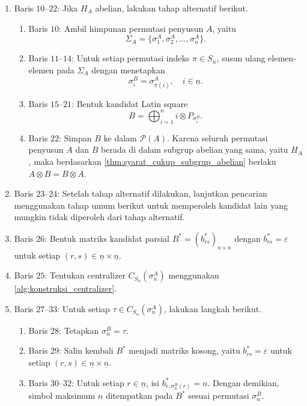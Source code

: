 \begin{algoritma}
\begin{enumerate}
    \item Baris $10$--$22$: Jika $H_A$ abelian, lakukan tahap alternatif berikut.
          \begin{enumerate}
            \item Baris $10$: Ambil himpunan permutasi penyusun $A$, yaitu
                  \[
                    \Sigma_A=\{\sigma_1^A,\sigma_2^A,\ldots,\sigma_n^A\}.
                  \]

            \item Baris $11$--$14$: Untuk setiap permutasi indeks $\pi\in S_n$, susun ulang elemen-elemen pada $\Sigma_A$ dengan menetapkan
                  \[
                    \sigma_i^B=\sigma_{\pi(i)}^A,
                    \quad i\in \underline{n}.
                  \]

            \item Baris $15$--$21$: Bentuk kandidat Latin square
                  \[
                    B=\bigoplus_{i=1}^{n} i\otimes P_{\sigma_i^B}.
                  \]

            \item Baris $22$: Simpan $B$ ke dalam $\mathcal{P}(A)$. Karena seluruh permutasi penyusun $A$ dan $B$ berada di dalam subgrup abelian yang sama, yaitu $H_A$, maka berdasarkan \autoref{thm:syarat_cukup_subgrup_abelian} berlaku $A\otimes B=B\otimes A$.
          \end{enumerate}

    \item Baris $23$--$24$: Setelah tahap alternatif dilakukan, lanjutkan pencarian menggunakan tahap umum berikut untuk memperoleh kandidat lain yang mungkin tidak diperoleh dari tahap alternatif.

    \item Baris $26$: Bentuk matriks kandidat parsial $B^*=(b^*_{rs})_{n\times n}$ dengan $b^*_{rs}=\varepsilon$ untuk setiap $(r,s)\in \underline{n}\times \underline{n}$.

    \item Baris $25$: Tentukan centralizer $C_{S_n}(\sigma_n^A)$ menggunakan \autoref{alg:konstruksi_centralizer}.

    \item Baris $27$--$33$: Untuk setiap $\tau\in C_{S_n}(\sigma_n^A)$, lakukan langkah berikut.
          \begin{enumerate}
            \item Baris $28$: Tetapkan $\sigma_n^B=\tau$.

            \item Baris $29$: Salin kembali $B^*$ menjadi matriks kosong, yaitu $b^*_{rs}=\varepsilon$ untuk setiap $(r,s)\in \underline{n}\times \underline{n}$.
            \item Baris $30$--$32$: Untuk setiap $r\in \underline{n}$, isi
                  $b^*_{r,\sigma_n^B(r)}=n$.
                  Dengan demikian, simbol maksimum $n$ ditempatkan pada $B^*$ sesuai permutasi $\sigma_n^B$.
          \end{enumerate}


\end{enumerate}
\end{algoritma}
